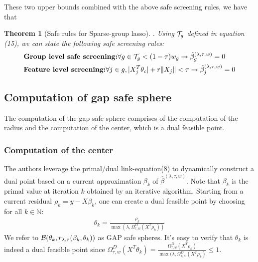\documentclass{article}
\def\cb{{\cal B}}
\newtheorem{theorem}{Theorem}[section]
\begin{document}
These two upper bounds combined with the above safe screening rules, we have that 
\begin{theorem}[Safe rules for Sparse-group lasso]. 
Using ${\cal T}_g$ defined in equation (15), we can state the following safe screening rules:
\begin{align}
& \textbf{Group level safe screening:} \forall g \in {\cal T}_g  < (1-\tau) w_g \rightarrow \hat{\beta}_g^{(\lambda,\tau,w)} = 0 \\
& \textbf{Feature level screening:} \forall j \in g, |X_j^T \theta_c| + r\|X_j\| < \tau \rightarrow \hat{\beta}_j^{(\lambda,\tau,w)} = 0
\end{align}
\end{theorem}

\subsection{Computation of gap safe sphere}

The computation of the gap safe sphere comprises of the computation of the radius and the computation of the center, which is a dual feasible point. 

\subsubsection{Computation of the center}
The authors leverage the primal/dual link-equation(8) to dynamically construct a dual point based on a current approximation $\beta_k$ of $\hat{\beta}^{(\lambda,\tau,w)}$. Note that $\beta_k$ is the primal value at iteration $k$ obtained by an iterative algorithm. Starting from a current residual $\rho_k = y - X\beta_k$, one can create a dual feasible point by choosing for all $k \in \mathbb{N}$:
\begin{align}
\theta_k = \frac{\rho_k}{\max(\lambda,\Omega^D_{\tau,w}(X^T \rho_k))}
\end{align}
We refer to $\cb(\theta_k, r_{\lambda,\tau}(\beta_k,\theta_k))$ as GAP safe spheres.  It's easy to verify that $\theta_k$ is indeed a dual feasible point since $\Omega^D_{\tau,w}(X^T \theta_k) = \frac{\Omega^D_{\tau,w}(X^T \rho_k)}{\max(\lambda,\Omega^D_{\tau,w}(X^T \rho_k)} \leq 1$.
\end{document}
